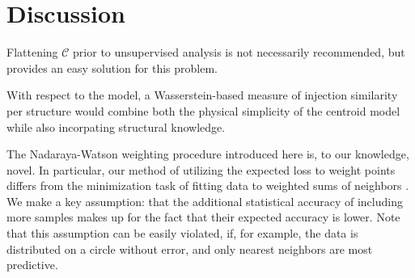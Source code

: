 \documentclass[NETN,manuscript]{stjour-new}
\begin{document}






\section{Discussion}

Flattening $\mathcal C$ prior to unsupervised analysis is not necessarily recommended, but provides an easy solution for this problem.

With respect to the model, a Wasserstein-based measure of injection similarity per structure would combine both the physical simplicity of the centroid model while also incorpating structural knowledge.

The Nadaraya-Watson weighting procedure introduced here is, to our knowledge, novel.  In particular, our method of utilizing the expected loss to weight points differs from the minimization task of fitting data to weighted sums of neighbors \citep{Saul2003-th}.  We make a key assumption: that the additional statistical accuracy of including more samples makes up for the fact that their expected accuracy is lower. Note that this assumption can be easily violated, if, for example, the data is distributed on a circle without error, and only nearest neighbors are most predictive.
\end{document}
